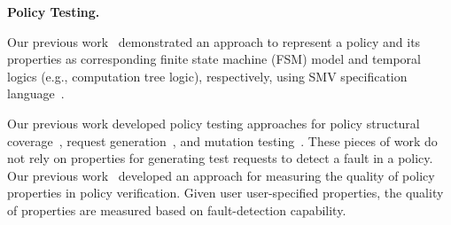 {\textbf{Policy Testing.}

Our previous work~\cite{hu10:model} demonstrated an approach
to represent a policy and its properties as
corresponding finite state machine (FSM) model and temporal
logics (e.g., computation tree logic), respectively, using SMV specification language~\cite{cimatti02:nusmv2}.

Our previous work developed policy testing approaches for policy
structural coverage~\cite{martin06:defining}, request
generation~\cite{martin07:automated}, and mutation
testing~\cite{martin07:fault}.
These pieces of work do not rely on properties for generating
test requests to detect a fault in a policy. 
Our previous work~\cite{martin08:assessing} developed an approach
for measuring the quality of policy properties in policy
verification. Given user user-specified
properties, the quality of properties are measured
based on fault-detection capability.
}